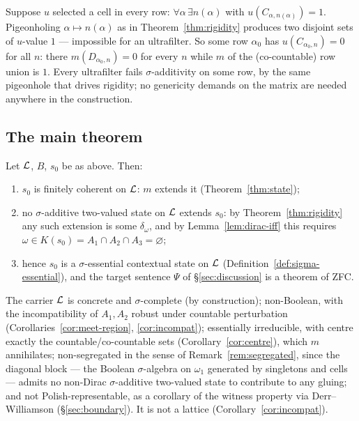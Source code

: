 \begin{remark}\label{rem:self-witnessing}
Suppose $u$ selected a cell in every row: $\forall\alpha\,\exists n(\alpha)$
with $u(C_{\alpha,n(\alpha)})=1$. Pigeonholing $\alpha\mapsto n(\alpha)$ as in
Theorem~\ref{thm:rigidity} produces two disjoint sets of $u$-value $1$ ---
impossible for an ultrafilter. So some row $\alpha_0$ has
$u(C_{\alpha_0,n})=0$ for all $n$: there $m(D_{\alpha_0,n})=0$ for every $n$
while $m$ of the (co-countable) row union is $1$. Every ultrafilter fails
$\sigma$-additivity on some row, by the same pigeonhole that drives rigidity; no
genericity demands on the matrix are needed anywhere in the construction.
\end{remark}

\subsection{The main theorem}

\begin{theorem}\label{thm:main}
Let $\mathcal{L}$, $B$, $s_0$ be as above. Then:
\begin{enumerate}[label=\textup{(\arabic*)}]
  \item $s_0$ is finitely coherent on $\mathcal{L}$: $m$ extends it
    (Theorem~\ref{thm:state});
  \item no $\sigma$-additive two-valued state on $\mathcal{L}$ extends $s_0$: by
    Theorem~\ref{thm:rigidity} any such extension is some $\delta_\omega$, and by
    Lemma~\ref{lem:dirac-iff} this requires
    $\omega\in K(s_0)=A_1\cap A_2\cap A_3=\varnothing$;
  \item hence $s_0$ is a $\sigma$-essential contextual state on $\mathcal{L}$
    \textup{(Definition~\ref{def:sigma-essential})}, and the target sentence
    $\Psi$ of \S\ref{sec:discussion} is a theorem of ZFC.
\end{enumerate}
\end{theorem}

\begin{proposition}[admissibility]\label{prop:adm}
The carrier $\mathcal{L}$ is concrete and $\sigma$-complete (by construction);
non-Boolean, with the incompatibility of $A_1,A_2$ robust under countable
perturbation (Corollaries~\ref{cor:meet-region}, \ref{cor:incompat});
essentially irreducible, with centre exactly the countable/co-countable sets
(Corollary~\ref{cor:centre}), which $m$ annihilates; non-segregated in the sense
of Remark~\ref{rem:segregated}, since the diagonal block --- the Boolean
$\sigma$-algebra on $\omega_1$ generated by singletons and cells --- admits no
non-Dirac $\sigma$-additive two-valued state to contribute to any gluing; and
not Polish-representable, as a corollary of the witness property via
Derr--Williamson (\S\ref{sec:boundary}). It is not a lattice
(Corollary~\ref{cor:incompat}).
\end{proposition}


